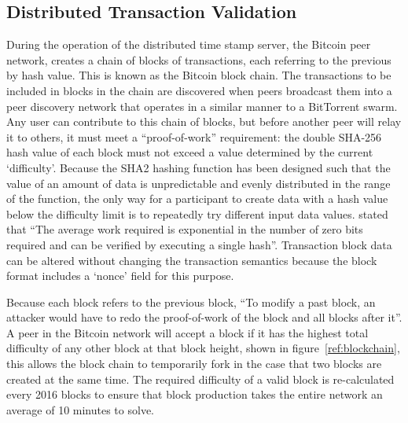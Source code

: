 \subsection{Distributed Transaction Validation}
During the operation of the distributed time stamp server, the Bitcoin peer network, creates a chain of blocks of transactions, each referring to the previous by hash value. This is known as the Bitcoin block chain.  The transactions to be included in blocks in the chain are discovered when peers broadcast them into a peer discovery network that operates in a similar manner to a BitTorrent swarm\cite{swarm}.  Any user can contribute to this chain of blocks, but before another peer will relay it to others, it must meet a ``proof-of-work'' requirement: the double SHA-256 hash value of each block must not exceed a value determined by the current `difficulty'.  Because the SHA2 hashing function has been designed such that the value of an amount of data is unpredictable and evenly distributed in the range of the function, the only way for a participant to create data with a hash value below the difficulty limit is to repeatedly try different input data values\cite{btc-crypto}.  \textcite{satoshi} stated that ``The average work required is exponential in the number of zero bits required and can be verified by executing a single hash''. Transaction block data can be altered without changing the transaction semantics because the block format includes a `nonce' field for this purpose.

Because each block refers to the previous block, ``To modify a past block, an attacker would have to redo the proof-of-work of the block and all blocks after it''.  A peer in the Bitcoin network will accept a block if it has the highest total difficulty of any other block at that block height, shown in figure~\ref{ref:blockchain}, this allows the block chain to temporarily fork in the case that two blocks are created at the same time. The required difficulty of a valid block is re-calculated every 2016 blocks to ensure that block production takes the entire network an average of 10 minutes to solve.

